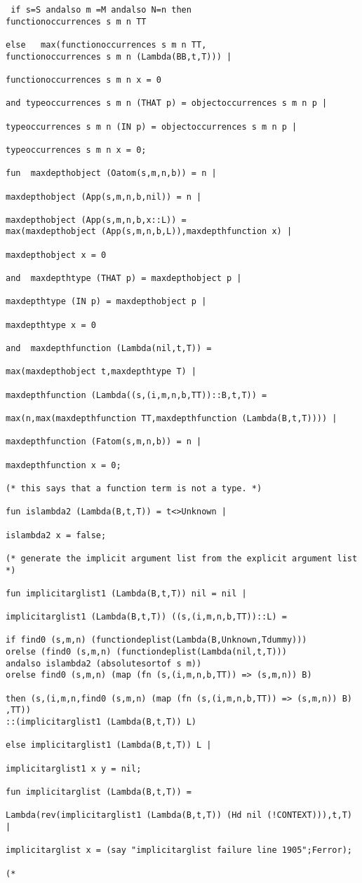 \documentclass[12pt]{article}
\begin{document}
\begin{verbatim}
 if s=S andalso m =M andalso N=n then 
functionoccurrences s m n TT 

else   max(functionoccurrences s m n TT,
functionoccurrences s m n (Lambda(BB,t,T))) |

functionoccurrences s m n x = 0

and typeoccurrences s m n (THAT p) = objectoccurrences s m n p |

typeoccurrences s m n (IN p) = objectoccurrences s m n p |

typeoccurrences s m n x = 0;

fun  maxdepthobject (Oatom(s,m,n,b)) = n |

maxdepthobject (App(s,m,n,b,nil)) = n |

maxdepthobject (App(s,m,n,b,x::L)) = 
max(maxdepthobject (App(s,m,n,b,L)),maxdepthfunction x) | 

maxdepthobject x = 0

and  maxdepthtype (THAT p) = maxdepthobject p |

maxdepthtype (IN p) = maxdepthobject p | 

maxdepthtype x = 0 

and  maxdepthfunction (Lambda(nil,t,T)) =

max(maxdepthobject t,maxdepthtype T) |

maxdepthfunction (Lambda((s,(i,m,n,b,TT))::B,t,T)) =

max(n,max(maxdepthfunction TT,maxdepthfunction (Lambda(B,t,T)))) |

maxdepthfunction (Fatom(s,m,n,b)) = n | 

maxdepthfunction x = 0;

(* this says that a function term is not a type. *)

fun islambda2 (Lambda(B,t,T)) = t<>Unknown |

islambda2 x = false;

(* generate the implicit argument list from the explicit argument list *)

fun implicitarglist1 (Lambda(B,t,T)) nil = nil |

implicitarglist1 (Lambda(B,t,T)) ((s,(i,m,n,b,TT))::L) =

if find0 (s,m,n) (functiondeplist(Lambda(B,Unknown,Tdummy)))
orelse (find0 (s,m,n) (functiondeplist(Lambda(nil,t,T))) 
andalso islambda2 (absolutesortof s m))
orelse find0 (s,m,n) (map (fn (s,(i,m,n,b,TT)) => (s,m,n)) B)

then (s,(i,m,n,find0 (s,m,n) (map (fn (s,(i,m,n,b,TT)) => (s,m,n)) B) ,TT))
::(implicitarglist1 (Lambda(B,t,T)) L)

else implicitarglist1 (Lambda(B,t,T)) L |

implicitarglist1 x y = nil;

fun implicitarglist (Lambda(B,t,T)) =

Lambda(rev(implicitarglist1 (Lambda(B,t,T)) (Hd nil (!CONTEXT))),t,T) |

implicitarglist x = (say "implicitarglist failure line 1905";Ferror);

(*

\end{verbatim}
\end{document}
